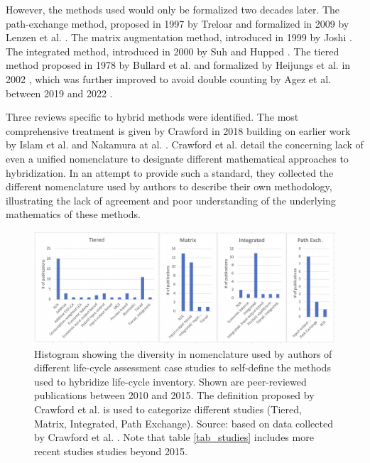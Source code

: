 \documentclass{article}
\begin{document}
        However, the methods used would only be formalized two decades later. The path-exchange method, proposed in 1997 by Treloar \cite{treloar_extracting_1997} and formalized in 2009 by Lenzen et al. \cite{lenzen_path_2009}. The matrix augmentation method, introduced in 1999 by Joshi \cite{joshi_product_1999}. The integrated method, introduced in 2000 by Suh and Hupped \cite{suh_gearing_2000}. The tiered method proposed in 1978 by Bullard et al. \cite{bullard_net_1978} and formalized by Heijungs et al. in 2002 \cite{heijungs_computational_2002}, which was further improved to avoid double counting by Agez et al. between 2019 and 2022 \cite{agez_lifting_2019}\cite{agez_hybridization_2020}\cite{agez_correcting_2022}.

        Three reviews specific to hybrid methods were identified. The most comprehensive treatment is given by Crawford in 2018 \cite{crawford_hybrid_2018} building on earlier work by Islam et al. \cite{islam_review_2016} and Nakamura at al. \cite{nakamura_inputoutput_2016}. Crawford et al. detail the concerning lack of even a unified nomenclature to designate different mathematical approaches to hybridization. In an attempt to provide such a standard, they collected the different nomenclature used by authors to describe their own methodology, illustrating the lack of agreement and poor understanding of the underlying mathematics of these methods. 
        
        \begin{figure}[h!]
        	\centering
        	\includegraphics[width=\textwidth]{figures/nomenclature.png}
        	\caption{Histogram showing the diversity in nomenclature used by authors of different life-cycle assessment case studies to self-define the methods used to hybridize life-cycle inventory. Shown are peer-reviewed publications between 2010 and 2015. The definition proposed by Crawford et al. is used to categorize different studies (Tiered, Matrix, Integrated, Path Exchange). Source: based on data collected by Crawford et al. \cite{crawford_hybrid_2018}. Note that table \ref{tab_studies} includes more recent studies studies beyond 2015.}
        	\label{fig:nomenclature}
        \end{figure}
        
\end{document}
